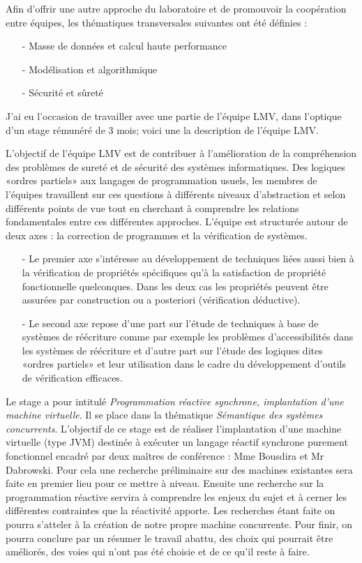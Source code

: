 \documentclass[10pt,a4paper]{article}
\begin{document}
		Afin d'offrir une autre approche du laboratoire et de promouvoir la coopération entre équipes, les thématiques transversales suivantes ont été définies :
		\begin{enumerate}
			\item[-] Masse de données et calcul haute performance
			\item[-] Modélisation et algorithmique
			\item[-] Sécurité et sûreté
		\end{enumerate}
		\medbreak
		
		J'ai eu l'occasion de travailler avec une partie de l'équipe LMV, dans l'optique d'un stage rémunéré de 3 mois; voici une la description de l'équipe LMV.
		\medbreak
		
		L'objectif de l'équipe LMV est de contribuer à l'amélioration de la compréhension des problèmes de sureté et de sécurité des systèmes  informatiques. Des logiques «ordres partiels» aux langages de programmation usuels, les membres de l'équipes travaillent sur ces questions à différents niveaux d'abstraction et selon différents points de vue tout en cherchant à comprendre les relations fondamentales entre ces différentes approches. L'équipe est structurée autour de deux axes : la correction de programmes et la vérification de systèmes.
		\begin{enumerate}
			\item[-] Le premier axe s'intéresse au développement de techniques liées aussi bien à la vérification de propriétés spécifiques qu'à la satisfaction de propriété fonctionnelle quelconques. Dans les deux cas les propriétés peuvent être assurées par construction ou a posteriori (vérification déductive).
			\item[-] Le second axe repose d'une part sur l'étude de techniques à base de systèmes de réécriture comme par exemple les problèmes d'accessibilités dans les systèmes de réécriture et d'autre part sur l'étude des logiques dites «ordres partiels» et leur utilisation dans le cadre du développement d'outils de vérification efficaces.
		\end{enumerate}
		\bigbreak
		
		Le stage a pour intitulé \textit{Programmation réactive synchrone, implantation d’une machine virtuelle}. Il se place dans la thématique \textit{Sémantique des systèmes concurrents}. L’objectif de ce stage est de réaliser l’implantation d’une machine virtuelle (type JVM) destinée à exécuter un langage réactif synchrone purement fonctionnel encadré par deux maîtres de conférence : Mme Bousdira et Mr Dabrowski.
		\smallbreak
		Pour cela une recherche préliminaire sur des machines existantes sera faite en premier lieu pour ce mettre à niveau. Ensuite une recherche sur la programmation réactive servira à comprendre les enjeux du sujet et à cerner les différentes contraintes que la réactivité apporte. Les recherches étant faite on pourra s'atteler à la création de notre propre machine concurrente. Pour finir, on pourra conclure par un résumer le travail abattu, des choix qui pourrait être améliorés, des voies qui n'ont pas été choisie et de ce qu'il reste à faire.
		\newpage
		
\end{document}
